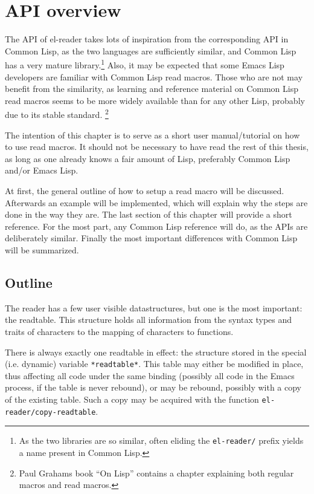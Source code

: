 \documentclass[a4paper,10pt,twoside]{report}
\newcommand{\el}{Emacs Lisp}
\newcommand{\cl}{Common Lisp}
\newcommand{\elr}{el-reader}
\newcommand{\sym}[1]{\texttt{#1}}
\newcommand{\fun}[1]{\texttt{#1}}
\begin{document}
\chapter{API overview}
\label{chapter:api-overview}

The API of \elr{} takes lots of inspiration from the corresponding API in \cl{},
as the two languages are sufficiently similar, and \cl{} has a very mature
library.\footnote{As the two libraries are so similar, often eliding the
  \sym{el-reader/} prefix yields a name present in \cl{}.}  Also, it may be
expected that some \el{} developers are familiar with \cl{} read macros.  Those
who are not may benefit from the similarity, as learning and reference material
on \cl{} read macros seems to be more widely available than for any other Lisp,
probably due to its stable standard.  \footnote{Paul Grahams book ``On
  Lisp''\cite[p.~224]{on-lisp} contains a chapter explaining both regular macros
  and read macros.}

The intention of this chapter is to serve as a short user manual/tutorial on how
to use read macros.  It should not be necessary to have read the rest of this
thesis, as long as one already knows a fair amount of Lisp, preferably \cl{}
and/or \el{}.

At first, the general outline of how to setup a read macro will be discussed.
Afterwards an example will be implemented, which will explain why the steps are
done in the way they are.  The last section of this chapter will provide a short
reference.  For the most part, any \cl{} reference will do, as the APIs are
deliberately similar.  Finally the most important differences with \cl{} will be
summarized.

\section{Outline}
\label{sec:outline}

The reader has a few user visible datastructures, but one is the most important:
the readtable.  This structure holds all information from the syntax types and
traits of characters to the mapping of characters to functions.

There is always exactly one readtable in effect: the structure stored in the
special (i.e. dynamic) variable \sym{*readtable*}.  This table may either be
modified in place, thus affecting all code under the same binding (possibly all
code in the Emacs process, if the table is never rebound), or may be rebound,
possibly with a copy of the existing table.  Such a copy may be acquired with
the function \fun{el-reader/copy-readtable}.
\end{document}
